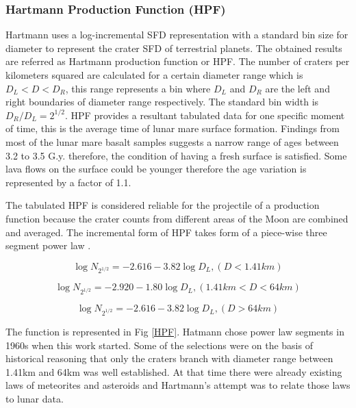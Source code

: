 \documentclass[11pt]{article}
\begin{document}
\subsubsection{Hartmann Production Function (HPF)}
Hartmann uses a log-incremental SFD representation with a standard bin size for diameter to represent the crater SFD of terrestrial planets. The obtained results are referred as Hartmann production function or HPF. The number of craters per kilometers squared are calculated for a certain diameter range which is $D_{L} < D < D_{R}$, this range represents a bin where $D_{L}$ and $D_{R}$ are the left and right boundaries of diameter range respectively. The standard bin width is $D_{R}/D_{L} = 2^{1/2}$. HPF provides a resultant tabulated data for one specific moment of time, this is the average time of lunar mare surface formation. Findings from most of the lunar mare basalt samples suggests a narrow range of ages between 3.2 to 3.5 G.y. \cite{stoffler2001stratigraphy} therefore, the condition of having a fresh surface is satisfied. Some lava flows on the surface could be younger \cite{hiesinger2000ages} therefore the age variation is represented by a factor of 1.1.

The tabulated HPF is considered reliable for the projectile of a production function because the crater counts from different areas of the Moon are combined and averaged. The incremental form of HPF takes form of a piece-wise three segment power law \cite{ivanov2002comparison}.

\begin{equation}
\log N_{2^{1/2}} = -2.616 - 3.82 \log D_{L}, (D<1.41km)
\end{equation}

\begin{equation}
\log N_{2^{1/2}} = -2.920 - 1.80 \log D_{L},
(1.41km < D < 64km)
\end{equation}

\begin{equation}
\log N_{2^{1/2}} = -2.616 - 3.82 \log D_{L},
(D>64km)
\end{equation}

The function is represented in Fig \ref{HPF}. Hatmann chose power law segments in 1960s when this work started. Some of the selections were on the basis of historical reasoning that only the craters branch with diameter range between 1.41km and 64km was well established. At that time there were already existing laws of meteorites and asteroids and Hartmann's attempt was to relate those laws to lunar data.
\end{document}

